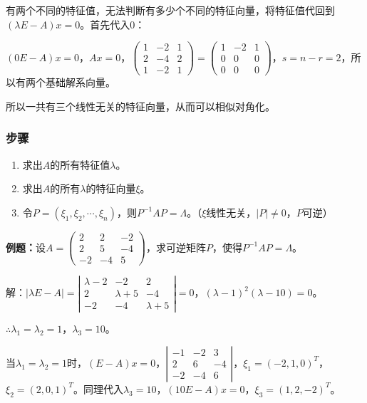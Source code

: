 \documentclass[UTF8, 12pt]{ctexart}
\begin{document}
有两个不同的特征值，无法判断有多少个不同的特征向量，将特征值代回到$(\lambda E-A)x=0$。首先代入0：

$(0E-A)x=0$，$Ax=0$，$\left(\begin{array}{ccc}
1 & -2 & 1 \\
2 & -4 & 2 \\
1 & -2 & 1
\end{array}\right)=\left(\begin{array}{ccc}
1 & -2 & 1 \\
0 & 0 & 0 \\
0 & 0 & 0
\end{array}\right)$，$s=n-r=2$，所以有两个基础解系向量。

所以一共有三个线性无关的特征向量，从而可以相似对角化。

\subsubsection{步骤}

\begin{enumerate}
\item 求出$A$的所有特征值$\lambda$。
\item 求出$A$的所有$\lambda$的特征向量$\xi$。
\item 令$P=(\xi_1,\xi_2,\cdots,\xi_n)$，则$P^{-1}AP=\Lambda$。（$\xi$线性无关，$\vert P\vert\neq0$，$P$可逆）
\end{enumerate}

\textbf{例题：}设$A=\left(\begin{array}{ccc}
2 & 2 & -2 \\
2 & 5 & -4 \\
-2 & -4 & 5
\end{array}\right)$，求可逆矩阵$P$，使得$P^{-1}AP=\Lambda$。

解：$\vert\lambda E-A\vert=\left|\begin{array}{ccc}
\lambda-2 & -2 & 2 \\
2 & \lambda+5 & -4 \\
-2 & -4 & \lambda+5
\end{array}\right|=0$，$(\lambda-1)^2(\lambda-10)=0$。

$\therefore\lambda_1=\lambda_2=1$，$\lambda_3=10$。

当$\lambda_1=\lambda_2=1$时，$(E-A)x=0$，$\left|\begin{array}{ccc}
-1 & -2 & 3 \\
2 & 6 & -4 \\
-2 & -4 & 6
\end{array}\right|$，$\xi_1=(-2,1,0)^T$，$\xi_2=(2,0,1)^T$。同理代入$\lambda_3=10$，$(10E-A)x=0$，$\xi_3=(1,2,-2)^T$。
\end{document}
